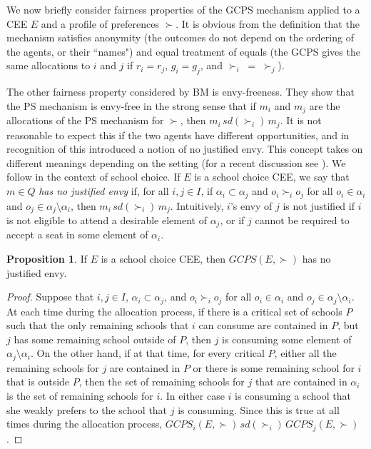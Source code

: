 \documentclass[12pt]{article}
\theoremstyle{definition}
\newtheorem{prop}{Proposition}
\begin{document}
We now briefly consider fairness properties of the GCPS mechanism applied to a CEE $E$ and a profile of preferences $\succ$.  It is obvious from the definition that the mechanism satisfies  anonymity (the outcomes do not depend on the ordering of the agents, or their ``names") and equal treatment of equals (the GCPS gives the same allocations to $i$ and $j$ if $r_i = r_j$, $g_i = g_j$, and $\succ_i \; = \; \succ_j$).

The other fairness property considered by BM is envy-freeness.  They show that the PS mechanism is envy-free in the strong sense that if $m_i$ and $m_j$ are the allocations of the PS mechanism for $\succ$, then $m_i \, sd(\succ_i) \, m_j$.  It is not reasonable to expect this if the two agents have different opportunities, and in recognition of this \cite{as03aer} introduced a notion of no justified envy.  This concept takes on different meanings depending on the setting (for a recent discussion see \cite{RoRoSh20}).  We follow \cite{yilmaz10geb} in the context of school choice.  If $E$ is a school choice CEE, we say that $m \in Q$ \emph{has no justified envy} if, for all $i,j \in I$, if $\alpha_i \subset \alpha_j$ and $o_i \succ_i o_j$ for all $o_i \in \alpha_i$ and $o_j \in \alpha_j \setminus \alpha_i$, then $m_i \, sd(\succ_i) \, m_j$.  Intuitively, $i$'s envy of $j$ is not justified if $i$ is not eligible to attend a desirable element of $\alpha_j$, or if $j$ cannot be required to accept a seat in some element of $\alpha_i$.

\begin{prop}
  If $E$ is a school choice CEE, then $GCPS(E,\succ)$ has no justified envy.
\end{prop}

\begin{proof}
  Suppose that $i,j \in I$, $\alpha_i \subset \alpha_j$, and $o_i \succ_i o_j$ for all $o_i \in \alpha_i$ and $o_j \in \alpha_j \setminus \alpha_i$.
  At each time during the allocation process, if there is a critical set of schools $P$ such that the only remaining schools that $i$ can consume are contained in $P$, but $j$ has some remaining school outside of $P$, then $j$ is consuming some element of $\alpha_j \setminus \alpha_i$.  On the other hand, if at that time, for every critical $P$, either all the remaining schools for $j$ are contained in $P$ or there is some remaining school for $i$ that is outside $P$, then the set of remaining schools for $j$ that are contained in $\alpha_i$ is the set of remaining schools for $i$.  In either case $i$ is consuming a school that she weakly prefers to the school that $j$ is consuming.  Since this is true at all times during the allocation process, $GCPS_i(E,\succ) \, sd(\succ_i) \, GCPS_j(E,\succ)$.
\end{proof}
\end{document}
